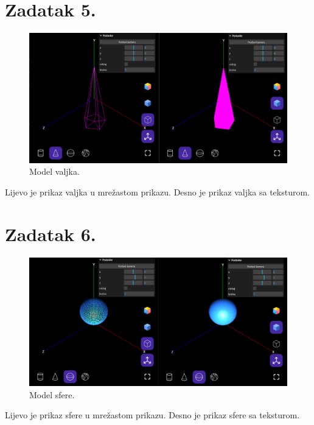 \documentclass[a4paper,12pt]{article}
\begin{document}
\pagebreak

\section{Zadatak 5.}


\begin{figure}[ht]
    \centering
    \includegraphics[scale=0.5]{image/zadatak5.png}
    \caption{Model valjka.}
\end{figure}
Lijevo je prikaz valjka u mrežastom prikazu. Desno je prikaz valjka sa teksturom.

\pagebreak

\section{Zadatak 6.}


\begin{figure}[ht]
    \centering
    \includegraphics[scale=0.5]{image/zadatak6.png}
    \caption{Model sfere.}
\end{figure}

Lijevo je prikaz sfere u mrežastom prikazu. Desno je prikaz sfere sa teksturom.

\pagebreak
\end{document}
